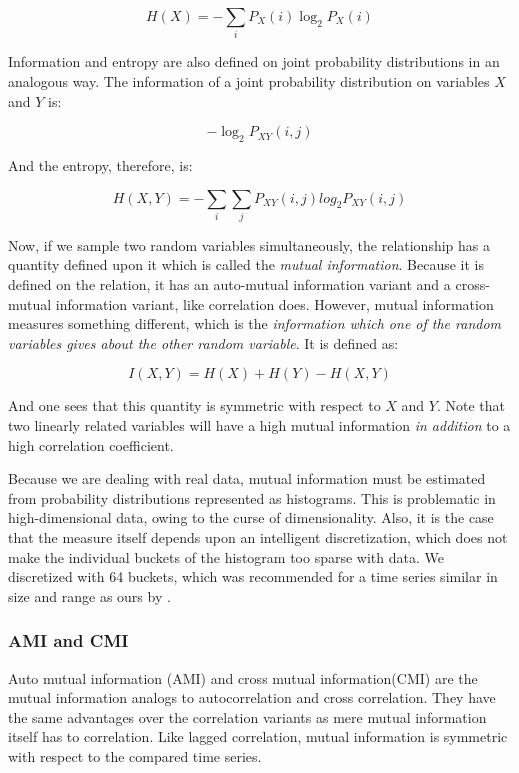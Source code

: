 \documentclass[12pt]{article}
\begin{document}
$$H(X) = -\sum_i P_X(i) \log_2 P_X(i)$$

Information and entropy are also defined on joint probability distributions in an analogous way. The information of a joint probability distribution on variables $X$ and $Y$ is:

$$ -\log_2 P_{XY}(i, j) $$

And the entropy, therefore, is:

$$H(X, Y) = -\sum_i \sum_j P_{XY}(i, j) log_2 P_{XY}(i, j)$$

Now, if we sample two random variables simultaneously, the relationship has a quantity defined upon it which is called the \emph{mutual information}. Because it is defined on the relation, it has an auto-mutual information variant and a cross-mutual information variant, like correlation does. However, mutual information measures something different, which is the \emph{information which one of the random variables gives about the other random variable}. It is defined as:

$$I(X, Y) = H(X) + H(Y) - H(X, Y)$$

And one sees that this quantity is symmetric with respect to $X$ and $Y$. Note that two linearly related variables will have a high mutual information \emph{in addition} to a high correlation coefficient.

Because we are dealing with real data, mutual information must be estimated from probability distributions represented as histograms. This is problematic in high-dimensional data, owing to the curse of dimensionality\cite{bellman}. Also, it is the case that the measure itself depends upon an intelligent discretization, which does not make the individual buckets of the histogram too sparse with data\cite{alzheimersmi}. We discretized with 64 buckets, which was recommended for a time series similar in size and range as ours by \cite{alzheimersmi}.

\subsubsection{AMI and CMI}

Auto mutual information (AMI) and cross mutual information(CMI) are the mutual information analogs to autocorrelation and cross correlation. They have the same advantages over the correlation variants as mere mutual information itself has to correlation. Like lagged correlation, mutual information is symmetric with respect to the compared time series.
\end{document}
